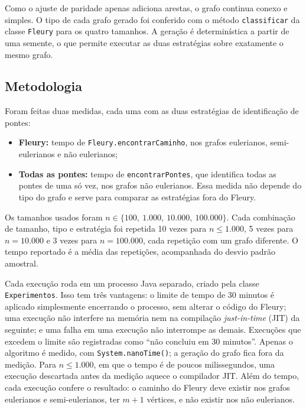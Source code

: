 Como o ajuste de paridade apenas adiciona arestas, o grafo continua conexo e simples. O tipo de cada grafo gerado foi conferido com o método \texttt{classificar} da classe \texttt{Fleury} para os quatro tamanhos. A geração é determinística a partir de uma semente, o que permite executar as duas estratégias sobre exatamente o mesmo grafo.

\subsection{Metodologia}

Foram feitas duas medidas, cada uma com as duas estratégias de identificação de pontes:

\begin{itemize}
  \item \textbf{Fleury:} tempo de \texttt{Fleury.encontrarCaminho}, nos grafos eulerianos, semi-eulerianos e não eulerianos;
  \item \textbf{Todas as pontes:} tempo de \texttt{encontrarPontes}, que identifica todas as pontes de uma só vez, nos grafos não eulerianos. Essa medida não depende do tipo do grafo e serve para comparar as estratégias fora do Fleury.
\end{itemize}

Os tamanhos usados foram $n \in \{100,\ 1.000,\ 10.000,\ 100.000\}$. Cada combinação de tamanho, tipo e estratégia foi repetida 10 vezes para $n \leq 1.000$, 5 vezes para $n = 10.000$ e 3 vezes para $n = 100.000$, cada repetição com um grafo diferente. O tempo reportado é a média das repetições, acompanhada do desvio padrão amostral.

Cada execução roda em um processo Java separado, criado pela classe \texttt{Experimentos}. Isso tem três vantagens: o limite de tempo de 30 minutos é aplicado simplesmente encerrando o processo, sem alterar o código do Fleury; uma execução não interfere na memória nem na compilação \emph{just-in-time} (JIT) da seguinte; e uma falha em uma execução não interrompe as demais. Execuções que excedem o limite são registradas como ``não concluiu em 30 minutos''. Apenas o algoritmo é medido, com \texttt{System.nanoTime()}; a geração do grafo fica fora da medição. Para $n \leq 1.000$, em que o tempo é de poucos milissegundos, uma execução descartada antes da medição aquece o compilador JIT. Além do tempo, cada execução confere o resultado: o caminho do Fleury deve existir nos grafos eulerianos e semi-eulerianos, ter $m + 1$ vértices, e não existir nos não eulerianos.

